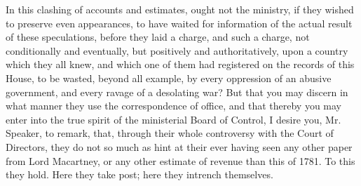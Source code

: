 In this clashing of accounts and estimates, ought not the ministry, if they wished to preserve even appearances, to have waited for information of the actual result of these speculations, before they laid a charge, and such a charge, not conditionally and eventually, but positively and authoritatively, upon a country which they all knew, and which one of them had registered on the records of this House, to be wasted, beyond all example, by every oppression of an abusive government, and every ravage of a desolating war? But that you may discern in what manner they use the correspondence of office, and that thereby you may enter into the true spirit of the ministerial Board of Control, I desire you, Mr. Speaker, to remark, that, through their whole controversy with the Court of Directors, they do not so much as hint at their ever having seen any other paper from Lord Macartney, or any other estimate of revenue than this of 1781. To this they hold. Here they take post; here they intrench themselves.

